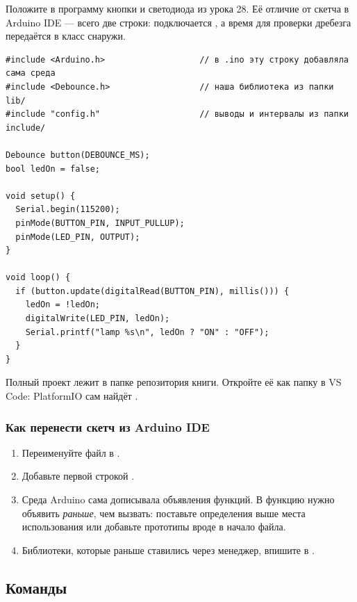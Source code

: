 Положите в  программу кнопки и светодиода из урока 28. Её отличие от скетча
в Arduino IDE --- всего две строки: подключается , а время для проверки
дребезга передаётся в класс снаружи.

\begin{Verbatim}[fontsize=\small,bgcolor=codebg]
#include <Arduino.h>                   // в .ino эту строку добавляла сама среда
#include <Debounce.h>                  // наша библиотека из папки lib/
#include "config.h"                    // выводы и интервалы из папки include/

Debounce button(DEBOUNCE_MS);
bool ledOn = false;

void setup() {
  Serial.begin(115200);
  pinMode(BUTTON_PIN, INPUT_PULLUP);
  pinMode(LED_PIN, OUTPUT);
}

void loop() {
  if (button.update(digitalRead(BUTTON_PIN), millis())) {
    ledOn = !ledOn;
    digitalWrite(LED_PIN, ledOn);
    Serial.printf("lamp %s\n", ledOn ? "ON" : "OFF");
  }
}
\end{Verbatim}

\begin{tip}
Полный проект лежит в папке  репозитория книги. Откройте её как папку
в VS Code: PlatformIO сам найдёт .
\end{tip}

\subsubsection*{Как перенести скетч из Arduino IDE}
\begin{enumerate}
  \item Переименуйте файл  в .
  \item Добавьте первой строкой .
  \item Среда Arduino сама дописывала объявления функций. В  функцию нужно
        объявить \emph{раньше}, чем вызвать: поставьте определения выше места использования
        или добавьте прототипы вроде  в начало файла.
  \item Библиотеки, которые раньше ставились через менеджер, впишите в .
\end{enumerate}

\subsection{Команды}

